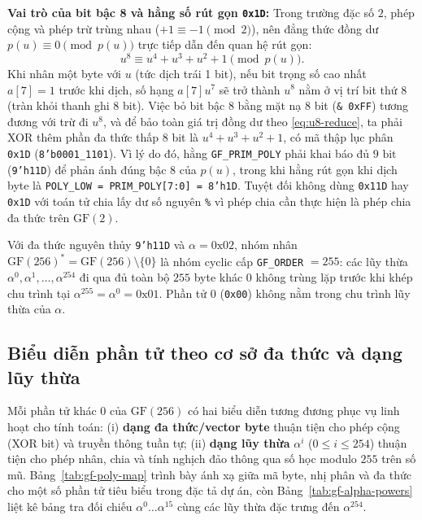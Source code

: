 \documentclass[12pt,a4paper]{report}
\begin{document}
\textbf{Vai trò của bit bậc 8 và hằng số rút gọn \texttt{0x1D}:} Trong trường đặc số $2$, phép cộng và phép trừ trùng nhau ($+1 \equiv -1 \pmod 2$), nên đẳng thức đồng dư $p(u) \equiv 0 \pmod{p(u)}$ trực tiếp dẫn đến quan hệ rút gọn:
\begin{equation}
    u^8 \equiv u^4 + u^3 + u^2 + 1 \pmod{p(u)}.
    \label{eq:u8-reduce}
\end{equation}
Khi nhân một byte với $u$ (tức dịch trái 1 bit), nếu bit trọng số cao nhất $a[7] = 1$ trước khi dịch, số hạng $a[7] u^7$ sẽ trở thành $u^8$ nằm ở vị trí bit thứ 8 (tràn khỏi thanh ghi 8 bit). Việc bỏ bit bậc 8 bằng mặt nạ 8 bit (\texttt{\& 0xFF}) tương đương với trừ đi $u^8$, và để bảo toàn giá trị đồng dư theo \eqref{eq:u8-reduce}, ta phải XOR thêm phần đa thức thấp 8 bit là $u^4 + u^3 + u^2 + 1$, có mã thập lục phân \texttt{0x1D} (\texttt{8'b0001\_1101}). Vì lý do đó, hằng \texttt{GF\_PRIM\_POLY} phải khai báo đủ $9\text{ bit}$ (\texttt{9'h11D}) để phản ánh đúng bậc 8 của $p(u)$, trong khi hằng rút gọn khi dịch byte là \texttt{POLY\_LOW = PRIM\_POLY[7:0] = 8'h1D}. Tuyệt đối không dùng \texttt{0x11D} hay \texttt{0x1D} với toán tử chia lấy dư số nguyên \texttt{\%} vì phép chia cần thực hiện là phép chia đa thức trên $\text{GF}(2)$.

Với đa thức nguyên thủy \texttt{9'h11D} và $\alpha = \text{0x02}$, nhóm nhân $\text{GF}(256)^* = \text{GF}(256) \setminus \{0\}$ là nhóm cyclic cấp \texttt{GF\_ORDER} $= 255$: các lũy thừa $\alpha^0, \alpha^1, \dots, \alpha^{254}$ đi qua đủ toàn bộ $255$ byte khác $0$ không trùng lặp trước khi khép chu trình tại $\alpha^{255} = \alpha^0 = \text{0x01}$. Phần tử $0$ (\texttt{0x00}) không nằm trong chu trình lũy thừa của $\alpha$.

\subsection{Biểu diễn phần tử theo cơ sở đa thức và dạng lũy thừa}

Mỗi phần tử khác $0$ của $\text{GF}(256)$ có hai biểu diễn tương đương phục vụ linh hoạt cho tính toán: (i) \textbf{dạng đa thức/vector byte} thuận tiện cho phép cộng (XOR bit) và truyền thông tuần tự; (ii) \textbf{dạng lũy thừa} $\alpha^i$ ($0 \le i \le 254$) thuận tiện cho phép nhân, chia và tính nghịch đảo thông qua số học modulo $255$ trên số mũ. Bảng~\ref{tab:gf-poly-map} trình bày ánh xạ giữa mã byte, nhị phân và đa thức cho một số phần tử tiêu biểu trong đặc tả dự án, còn Bảng~\ref{tab:gf-alpha-powers} liệt kê bảng tra đối chiếu $\alpha^0 \dots \alpha^{15}$ cùng các lũy thừa đặc trưng đến $\alpha^{254}$.
\end{document}
